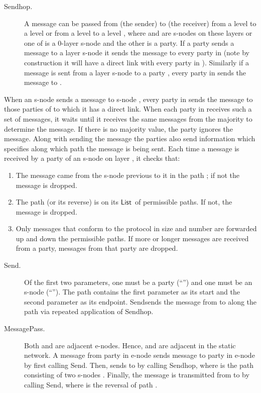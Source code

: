 \documentclass[11pt,letter]{article}
\theoremstyle{mytheoremstyle}
\newcommand{\Sendhop}{\textsf{Sendhop}}
\newcommand{\Send}{\textsf{Send}}
\newcommand{\MessagePass}{\textsf{MessagePass}}
\newcommand{\lst}{\ensuremath{\mathsf{List}}}
\begin{document}
\begin{description}
{\begin{description}
	\item[\Sendhop.]
	A message  can be passed from  (the sender) to  (the receiver) from a level  to a level  or from a level  to a level , where  and  are \textsf{s-node}s on these layers or one of  is a 0-layer \textsf{s-node} and the other is a party. If a party  sends a message to a layer  \textsf{s-node}  it sends the message to every party in  (note by construction it will have a direct link with every party in ). Similarly if a message is sent from a layer  \textsf{s-node}  to a party , every party in  sends the message to .
\end{description}

When an \textsf{s-node}  sends a message to \textsf{s-node} , every party in  sends the message to those parties of  to which it has a direct link. When each party in  receives such a set of messages, it waits until it receives the same messages from the majority to determine the message. If there is no majority value, the party ignores the message. Along with sending the message the parties also send information which specifies along which path  the message is being sent. Each time a message is received by a party of an \textsf{s-node}  on layer , it checks that:

\begin{enumerate}
	\item The message came from the \textsf{s-node} previous to it in the path ; if not the message is dropped.
	\item The path  (or its reverse) is on its \lst\ of permissible paths. If not, the message is dropped.	
	\item Only messages that conform to the protocol in size and number are forwarded up and down the permissible paths. If more or longer messages are received from a party, messages from that party are dropped.
\end{enumerate}

\begin{description}
	\item[\Send.]
	Of the first two parameters, one must be a party (``'') and one must be an \textsf{s-node} (``''). The path  contains the first parameter  as its start and the second parameter  as its endpoint. \Send sends the message  from  to  along the path  via repeated application of \Sendhop.
	
	\item[\MessagePass.]
	Both  and  are adjacent \textsf{e-node}s. Hence,  and  are adjacent in the static network.
	A message from party  in \textsf{e-node}  sends message  to party  in
	\textsf{e-node}  by first calling \Send. Then,  sends  to  by calling \Sendhop, where  is the path consisting of two \textsf{s-node}s . Finally, the message is transmitted from  to  by calling \Send, where  is the reversal of path .
\end{description}

}
\end{description}
\end{document}
